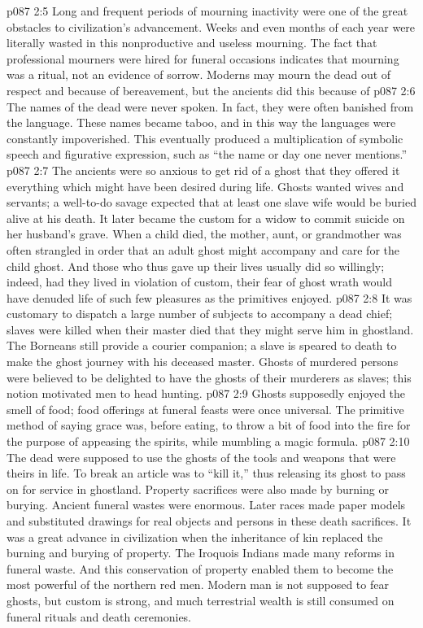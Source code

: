 \vs p087 2:5 Long and frequent periods of mourning inactivity were one of the great obstacles to civilization’s advancement. Weeks and even months of each year were literally wasted in this nonproductive and useless mourning. The fact that professional mourners were hired for funeral occasions indicates that mourning was a ritual, not an evidence of sorrow. Moderns may mourn the dead out of respect and because of bereavement, but the ancients did this because of 
\vs p087 2:6 The names of the dead were never spoken. In fact, they were often banished from the language. These names became taboo, and in this way the languages were constantly impoverished. This eventually produced a multiplication of symbolic speech and figurative expression, such as “the name or day one never mentions.”
\vs p087 2:7 \pc The ancients were so anxious to get rid of a ghost that they offered it everything which might have been desired during life. Ghosts wanted wives and servants; a well\hyp{}to\hyp{}do savage expected that at least one slave wife would be buried alive at his death. It later became the custom for a widow to commit suicide on her husband’s grave. When a child died, the mother, aunt, or grandmother was often strangled in order that an adult ghost might accompany and care for the child ghost. And those who thus gave up their lives usually did so willingly; indeed, had they lived in violation of custom, their fear of ghost wrath would have denuded life of such few pleasures as the primitives enjoyed.
\vs p087 2:8 It was customary to dispatch a large number of subjects to accompany a dead chief; slaves were killed when their master died that they might serve him in ghostland. The Borneans still provide a courier companion; a slave is speared to death to make the ghost journey with his deceased master. Ghosts of murdered persons were believed to be delighted to have the ghosts of their murderers as slaves; this notion motivated men to head hunting.
\vs p087 2:9 Ghosts supposedly enjoyed the smell of food; food offerings at funeral feasts were once universal. The primitive method of saying grace was, before eating, to throw a bit of food into the fire for the purpose of appeasing the spirits, while mumbling a magic formula.
\vs p087 2:10 The dead were supposed to use the ghosts of the tools and weapons that were theirs in life. To break an article was to “kill it,” thus releasing its ghost to pass on for service in ghostland. Property sacrifices were also made by burning or burying. Ancient funeral wastes were enormous. Later races made paper models and substituted drawings for real objects and persons in these death sacrifices. It was a great advance in civilization when the inheritance of kin replaced the burning and burying of property. The Iroquois Indians made many reforms in funeral waste. And this conservation of property enabled them to become the most powerful of the northern red men. Modern man is not supposed to fear ghosts, but custom is strong, and much terrestrial wealth is still consumed on funeral rituals and death ceremonies.
